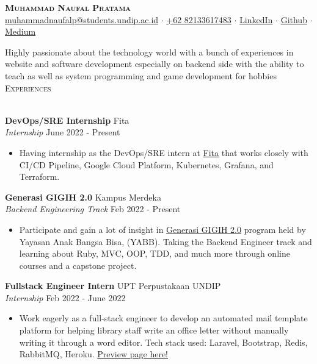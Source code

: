 \documentclass[a4paper]{article}
\newcommand{\lineunder} {
    \vspace*{-8pt} \\
    \hspace*{-18pt} \hrulefill \\
}
\newcommand{\header} [1] {
    {\hspace*{-18pt}\vspace*{6pt} \textsc{#1}}
    \vspace*{-6pt} \lineunder
}
\begin{document}
\vspace*{-40pt}

\vspace*{-10pt}
\begin{center}
	{\Huge \scshape \textbf{Muhammad Naufal Pratama}}\\
	\href{mailto:muhammadnaufalp@students.undip.ac.id}{muhammadnaufalp@students.undip.ac.id} $\cdot$ \href{https://wa.me/6282133617483}{+62 82133617483} $\cdot$ \href{https://linkedin.com/in/mnpratamaa}{LinkedIn} $\cdot$ \href{https://github.com/mhnaufal}{Github} $\cdot$ \href{mprtmma.medium.com}{Medium}\\
\end{center}

Highly passionate about the technology world with a bunch of experiences in website and software development especially on backend side with the ability to teach as well as system programming and game development for hobbies\\

\header{Experiences}
\vspace{1mm}

\textbf{DevOps/SRE Internship} \hfill Fita\\
\textit{Internship} \hfill June 2022 - Present\\
\vspace{-1mm}
\begin{itemize} \itemsep 1pt
	\item Having internship as the DevOps/SRE intern at \href{https://fita.co.id/}{Fita} that works closely with CI/CD Pipeline, Google Cloud Platform, Kubernetes, Grafana, and Terraform.
\end{itemize}

\textbf{Generasi GIGIH 2.0} \hfill Kampus Merdeka \\
\textit{Backend Engineering Track} \hfill Feb 2022 - Present\\
\vspace{-1mm}
\begin{itemize} \itemsep 1pt
	\item Participate and gain a lot of insight in \href{https://www.anakbangsabisa.org/generasi-gigih/}{Generasi GIGIH 2.0} program held by Yayasan Anak Bangsa Bisa, (YABB). Taking the Backend Engineer track and learning about Ruby, MVC, OOP, TDD, and much more through online courses and a capstone project.
\end{itemize}

\textbf{Fullstack Engineer Intern} \hfill UPT Perpustakaan UNDIP \\
\textit{Internship} \hfill Feb 2022 - June 2022\\
\vspace{-1mm}
\begin{itemize} \itemsep 1pt
	\item Work eagerly as a full-stack engineer to develop an automated mail template platform for helping library staff write an office letter without manually writing it through a word editor. Tech stack used: Laravel, Bootstrap, Redis, RabbitMQ, Heroku. \href{http://template-surat-testing.herokuapp.com/}{Preview page here!}
\end{itemize}
\end{document}
